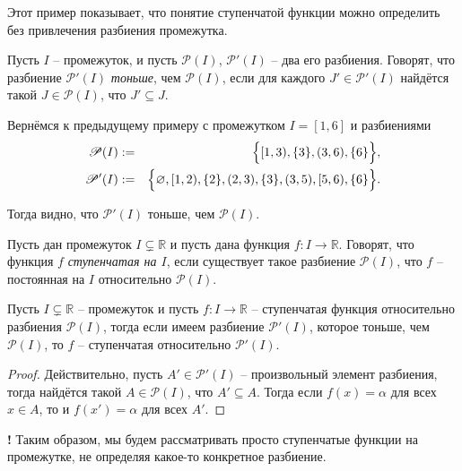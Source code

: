 Этот пример показывает, что понятие ступенчатой функции можно определить без привлечения разбиения промежутка.

\begin{definition}\label{fiber}
Пусть $I$ -- промежуток, и пусть $\mathscr{P}(I)$, $\mathscr{P}'(I)$ -- два его разбиения. Говорят, что разбиение $\mathscr{P}'(I)$ \textit{тоньше}, чем $\mathscr{P}(I)$, если для каждого $J' \in \mathscr{P}'(I)$ найдётся такой $J \in \mathscr{P}(I)$, что $J' \subseteq J$.
\end{definition}

\begin{example}
 Вернёмся к предыдущему примеру с промежутком $I = [1,6]$ и разбиениями   
 \begin{eqnarray*}
     \mathscr{P}(I) &:=& \Bigl\{[1,3), \{3\}, (3,6), \{6\} \Bigr\},\\
     \mathscr{P}'(I) &: =& \Bigl\{\varnothing, [1,2), \{2\}, (2,3), \{3\}, (3,5), [5,6),\{6\} \Bigr\}.
 \end{eqnarray*}

Тогда видно, что $\mathscr{P}'(I)$ тоньше, чем $\mathscr{P}(I)$.
\end{example}


\begin{definition}
    Пусть дан промежуток $I \subsetneq \mathbb{R}$ и пусть дана функция $f: I \to \mathbb{R}$. Говорят, что функция $f$ \textit{ступенчатая на $I$}, если существует такое разбиение $\mathscr{P}(I)$, что $f$ -- постоянная на $I$ относительно $\mathscr{P}(I).$
\end{definition}


\begin{lemma}\label{fiber_for_functions}
  Пусть $I \subsetneq \mathbb{R}$ -- промежуток и пусть $f:I \to \mathbb{R}$ -- ступенчатая функция относительно разбиения $\mathscr{P}(I)$, тогда если имеем разбиение $\mathscr{P}'(I)$, которое тоньше, чем $\mathscr{P}(I)$, то $f$ -- ступенчатая относительно $\mathscr{P}'(I).$ 
\end{lemma}

\begin{proof}
    Действительно, пусть $A' \in \mathscr{P}'(I)$ -- произвольный элемент разбиения, тогда найдётся такой $A \in \mathscr{P}(I)$, что $A' \subseteq A$. Тогда если $f(x) = \alpha$ для всех $x \in A$, то и $f(x') = \alpha$ для всех $A'.$
\end{proof}

\begin{mydanger}{\bf !}
    Таким образом, мы будем рассматривать просто ступенчатые функции на промежутке, не определяя какое-то конкретное разбиение.
\end{mydanger}


